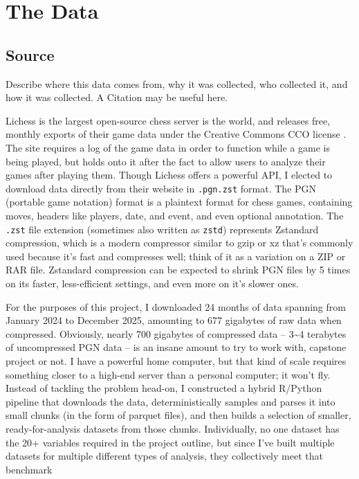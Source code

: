\documentclass[
  12pt]{article}
\begin{document}
\newpage

\section{The Data}\label{sec-data}

\subsection{Source}\label{sec-source}

Describe where this data comes from, why it was collected, who collected
it, and how it was collected. A Citation may be useful here.

Lichess is the largest open-source chess server is the world, and
releases free, monthly exports of their game data under the Creative
Commons CCO license \citep{lichessDatabase}. The site requires a log of
the game data in order to function while a game is being played, but
holds onto it after the fact to allow users to analyze their games after
playing them. Though Lichess offers a powerful API, I elected to
download data directly from their website in \texttt{.pgn.zst} format.
The PGN (portable game notation) format is a plaintext format for chess
games, containing moves, headers like players, date, and event, and even
optional annotation. The \texttt{.zst} file extension (sometimes also
written as \texttt{zstd}) represents Zstandard compression, which is a
modern compressor similar to gzip or xz that's commonly used because
it's fast and compresses well; think of it as a variation on a ZIP or
RAR file. Zstandard compression can be expected to shrink PGN files by 5
times on its faster, less-efficient settings, and even more on it's
slower ones.

For the purposes of this project, I downloaded 24 months of data
spanning from January 2024 to December 2025, amounting to 677 gigabytes
of raw data when compressed. Obviously, nearly 700 gigabytes of
compressed data -- 3\textasciitilde4 terabytes of uncompressed PGN data
-- is an insane amount to try to work with, capstone project or not. I
have a powerful home computer, but that kind of scale requires something
closer to a high-end server than a personal computer; it won't fly.
Instead of tackling the problem head-on, I constructed a hybrid R/Python
pipeline that downloads the data, deterministically samples and parses
it into small chunks (in the form of parquet files), and then builds a
selection of smaller, ready-for-analysis datasets from those chunks.
Individually, no one dataset has the 20+ variables required in the
project outline, but since I've built multiple datasets for multiple
different types of analysis, they collectively meet that benchmark
\end{document}
